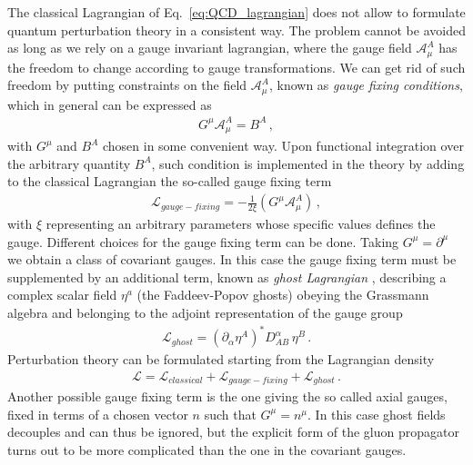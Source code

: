 %
The classical Lagrangian of Eq.~\ref{eq:QCD_lagrangian} does not allow to formulate quantum
perturbation theory in a consistent way. The problem cannot be avoided as long as
we rely on a gauge invariant lagrangian, where the gauge field $\mathcal{A}^A_{\mu}$
has the freedom to change according to gauge transformations.
We can get rid of such freedom by putting constraints on the field $\mathcal{A}^A_{\mu}$, 
known as \textit{gauge fixing conditions}, which in general can be expressed as
\begin{align}
    \label{eq:gauge_fixing}
    G^{\mu}\mathcal{A}_{\mu}^A = B^A\,,
\end{align}
with $G^{\mu}$ and $B^A$ chosen in some convenient way. 
Upon functional integration over the arbitrary quantity $B^A$, such condition is implemented 
in the theory by adding to the classical Lagrangian the so-called gauge fixing term
\begin{align}
    \label{eq:Gauge_fixing_lorents}
    \mathcal{L}_{gauge-fixing} = -\frac{1}{2\xi}\left(G^{\mu}\mathcal{A}_{\mu}^A\right)\,,
\end{align}
with $\xi$ representing an arbitrary parameters whose specific values defines the gauge.
Different choices for the gauge fixing term can be done. Taking $G^{\mu}=\partial^{\mu}$ we obtain
a class of covariant gauges. In this case the gauge fixing term must be supplemented by an additional term,
known as \textit{ghost Lagrangian} \cite{Faddeev:1967fc},
describing a complex scalar field $\eta^a$ (the Faddeev-Popov ghosts) obeying the Grassmann algebra and belonging to the adjoint
representation of the gauge group
\begin{align}
    \label{eq:ghosts_lagrangian}
    \mathcal{L}_{ghost} = \left(\partial_{\alpha}\eta^A\right)^* D^{\alpha}_{AB}\, \eta^B\, .
\end{align}
Perturbation theory can be formulated starting from the Lagrangian density
\begin{align}
    \label{eq:QCD_lagrangian_gauge_fixing}
    \mathcal{L} = \mathcal{L}_{classical} + \mathcal{L}_{gauge-fixing} + \mathcal{L}_{ghost}\, .
\end{align}
Another possible gauge fixing term is the one giving the so called axial gauges, fixed
in terms of a chosen vector $n$ such that $G^{\mu}=n^{\mu}$. In this case ghost fields decouples
and can thus be ignored, but the explicit form of the gluon propagator turns out to be more complicated than 
the one in the covariant gauges.

